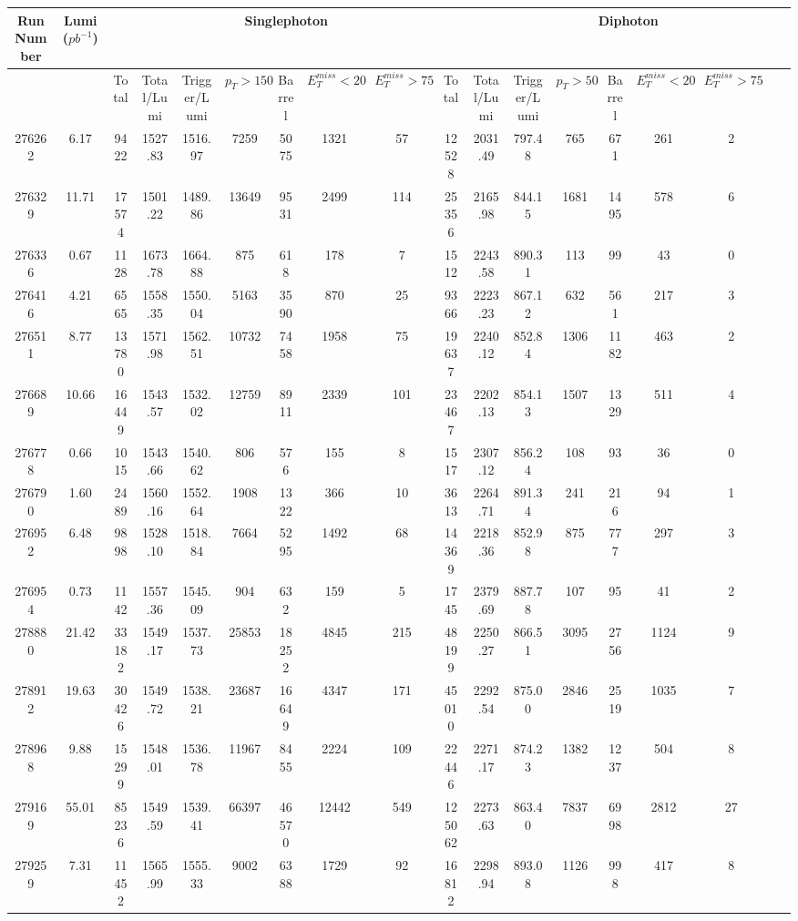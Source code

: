 \documentclass[10pt]{extarticle}
\begin{document}
\begin{longtable}{|c|c|c|c|c|c|c|c|c|c|c|c|c|c|c|c|c|c|}
\hline 
Run Number & Lumi ($pb^{-1}$) & \multicolumn{8}{|c|}{Singlephoton} & \multicolumn{8}{|c|}{Diphoton} \\ 
\hline 
 & & Total & Total/Lumi & Trigger/Lumi & $p_{T} > 150$ & Barrel & $E_{T}^{miss} < 20$ & $E_{T}^{miss} > 75$ & Total & Total/Lumi & Trigger/Lumi & $p_{T} > 50$ & Barrel & $E_{T}^{miss} < 20$ & $E_{T}^{miss} > 75$ \\ 
\hline 
276262&6.17&9422&1527.83&1516.97&7259&5075&1321&57&12528&2031.49&797.48&765&671&261&2 \\ 
\hline 
276329&11.71&17574&1501.22&1489.86&13649&9531&2499&114&25356&2165.98&844.15&1681&1495&578&6 \\ 
\hline 
276336&0.67&1128&1673.78&1664.88&875&618&178&7&1512&2243.58&890.31&113&99&43&0 \\ 
\hline 
276416&4.21&6565&1558.35&1550.04&5163&3590&870&25&9366&2223.23&867.12&632&561&217&3 \\ 
\hline 
276511&8.77&13780&1571.98&1562.51&10732&7458&1958&75&19637&2240.12&852.84&1306&1182&463&2 \\ 
\hline 
276689&10.66&16449&1543.57&1532.02&12759&8911&2339&101&23467&2202.13&854.13&1507&1329&511&4 \\ 
\hline 
276778&0.66&1015&1543.66&1540.62&806&576&155&8&1517&2307.12&856.24&108&93&36&0 \\ 
\hline 
276790&1.60&2489&1560.16&1552.64&1908&1322&366&10&3613&2264.71&891.34&241&216&94&1 \\ 
\hline 
276952&6.48&9898&1528.10&1518.84&7664&5295&1492&68&14369&2218.36&852.98&875&777&297&3 \\ 
\hline 
276954&0.73&1142&1557.36&1545.09&904&632&159&5&1745&2379.69&887.78&107&95&41&2 \\ 
\hline 
278880&21.42&33182&1549.17&1537.73&25853&18252&4845&215&48199&2250.27&866.51&3095&2756&1124&9 \\ 
\hline 
278912&19.63&30426&1549.72&1538.21&23687&16649&4347&171&45010&2292.54&875.00&2846&2519&1035&7 \\ 
\hline 
278968&9.88&15299&1548.01&1536.78&11967&8455&2224&109&22446&2271.17&874.23&1382&1237&504&8 \\ 
\hline 
279169&55.01&85236&1549.59&1539.41&66397&46570&12442&549&125062&2273.63&863.40&7837&6998&2812&27 \\ 
\hline 
279259&7.31&11452&1565.99&1555.33&9002&6388&1729&92&16812&2298.94&893.08&1126&998&417&8 \\ 

\end{longtable}
\end{document}
